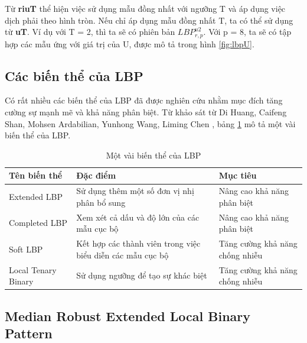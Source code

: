  Từ \textbf{riuT} thể hiện việc sử dụng mẫu đồng nhất với ngưỡng T và áp dụng việc dịch phải theo hình tròn. Nếu chỉ áp dụng mẫu đồng nhất T, ta có thể sử dụng từ \textbf{uT}. Ví dụ với T = 2, thì ta sẽ có phiên bản $LBP_{r, p}^{u2}$. Với p = 8, ta sẽ có tập hợp các mẫu ứng với giá trị của U, được mô tả trong hình \ref{fig:lbpU}.
\subsection{Các biến thể của LBP}
Có rất nhiều các biến thể của LBP đã được nghiên cứu nhằm mục đích tăng cường sự mạnh mẽ và khả năng phân biệt. Từ khảo sát từ Di Huang, Caifeng Shan, Mohsen Ardabilian, Yunhong Wang, Liming Chen \cite{lbpVariantSurvey}, bảng \ref{tab:lbpVariant} mô tả một vài biến thể của LBP. 


\begin{table}[h]
    \centering
    \renewcommand{\arraystretch}{1.3} %
    \begin{tabular}{p{4cm} p{7cm} p{3cm}}
        \toprule
        \textbf{Tên biến thể} & \textbf{Đặc điểm} & \textbf{Mục tiêu} \\
        \midrule
        Extended LBP & Sử dụng thêm một số đơn vị nhị phân bổ sung  & Nâng cao khả năng phân biệt
        \\ \midrule
        Completed LBP & Xem xét cả dấu và độ lớn của các mẫu cục bộ & Nâng cao khả năng phân biệt
        \\ \midrule
        Soft LBP & Kết hợp các thành viên trong việc biểu diễn các mẫu cục bộ & Tăng cường khả năng chống nhiễu
        \\ \midrule 
        Local Tenary Binary & Sử dụng ngưỡng để tạo sự khác biệt & Tăng cường khả năng chống nhiễu
        \\
                        \bottomrule

    \end{tabular}
    \caption{Một vài biến thể của LBP}
    \label{tab:lbpVariant}
\end{table}



\newpage
\subsection{Median Robust Extended Local Binary Pattern}


